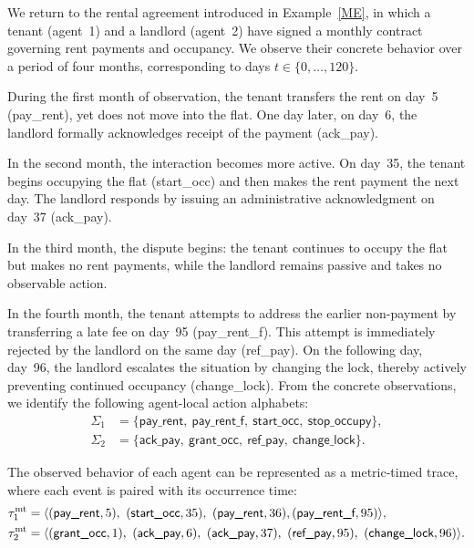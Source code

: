  \begin{example}
 \label{ex:timed-words-only}
 We return to the rental agreement introduced in Example~\ref{ME}, in which a tenant (agent~1) and a landlord (agent~2) have signed a monthly contract governing rent payments and occupancy.
 We observe their concrete behavior over a period of four months, corresponding to days $t\in\{0,\dots,120\}$.
 
 During the first month of observation, the tenant transfers the rent on day~5 (\textsf{pay\_rent}), yet does not move into the flat. One day later, on day~6, the landlord formally acknowledges receipt of the payment (\textsf{ack\_pay}).
 
 In the second month, the interaction becomes more active. On day~35, the tenant begins occupying the flat (\textsf{start\_occ}) and then makes the rent payment the next day. The landlord responds by issuing an administrative acknowledgment on day~37 (\textsf{ack\_pay}).
 
 In the third month, the dispute begins: the tenant continues to occupy the flat but makes no rent payments, while the landlord remains passive and takes no observable action.
 
 In the fourth month, the tenant attempts to address the earlier non-payment by transferring a late fee on day~95 (\textsf{pay\_rent\_f}). This attempt is immediately rejected by the landlord on the same day (\textsf{ref\_pay}). On the following day, day~96, the landlord escalates the situation by changing the lock, thereby actively preventing continued occupancy (\textsf{change\_lock}).
 From the concrete observations, we identify the following agent-local action alphabets:
 \[
 \begin{aligned}
 \Sigma_1 &= \{\textsf{pay\_rent},\ \textsf{pay\_rent\_f},\ \textsf{start\_occ},\ \textsf{stop\_occupy}\},\\
 \Sigma_2 &= \{\textsf{ack\_pay},\ \textsf{grant\_occ},\ \textsf{ref\_pay},\ \textsf{change\_lock}\}.
 \end{aligned}
 \]
 
 The observed behavior of each agent can be represented as a metric-timed trace, where each event is paired with its occurrence time:
 $$
 \begin{aligned}
 \taumt_{1}
 &=\trace{(\textsf{pay\_rent},5),\ (\textsf{start\_occ},35),\ (\textsf{pay\_rent},36), (\textsf{pay\_rent\_f},95)},\\
 \taumt_{2}
 &=\trace{(\textsf{grant\_occ},1),\ (\textsf{ack\_pay},6),\ (\textsf{ack\_pay},37),\ (\textsf{ref\_pay},95),\ (\textsf{change\_lock},96)}.
 \end{aligned}
 $$
 \end{example}
 
